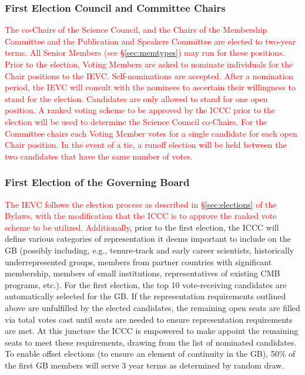 \documentclass[12pt]{article}
\begin{document}
\subsubsection{First Election Council and Committee Chairs}
\textcolor{red}{The co-Chairs of the Science Council, and the Chairs of the Membership Committee and the Publication and Speakers Committee are elected to two-year terms. All Senior Members (see \S\ref{sec:memtypes}) may  run for these positions.  Prior to the election, Voting Members are asked to nominate individuals for the Chair positions to the IEVC.   Self-nominations are accepted.
After a nomination period, the IEVC will consult with the nominees to ascertain their willingness to stand for the election. Candidates are only allowed to stand for one open position. 
A ranked voting scheme to be approved by the ICCC prior to the election will be used to determine the Science Council co-Chairs. For the Committee chairs each Voting Member votes for a single candidate for each open Chair position. In the event of a tie, a runoff election will be held between the two candidates that have the same number of votes. }


\subsubsection{First Election of the Governing Board}
\textcolor{red}{The IEVC follows the election process as described in \S\ref{sec:elections} of the Bylaws, with the modification that the ICCC is to approve the ranked vote scheme to be utilized. Additionally,} prior to the first election, the ICCC will define various categories of representation it deems important to include on the GB (possibly including, e.g., tenure-track and early career scientists,  historically underrepresented groups, members from partner countries with significant membership, members of small institutions, representatives of existing CMB programs, etc.). For the first election, the top 10 vote-receiving candidates are automatically selected for the GB. If the representation requirements outlined above are unfulfilled by the elected candidates, the remaining open seats are filled via total votes cast until seats are needed to ensure representation requirements are met. At this juncture the  ICCC is empowered to make appoint the remaining seats to meet these requirements, drawing from the list of nominated candidates. 
To enable offset elections (to ensure an element of continuity in the GB), 50\% of the first GB members will serve 3 year terms as determined by random draw. 
\end{document}
